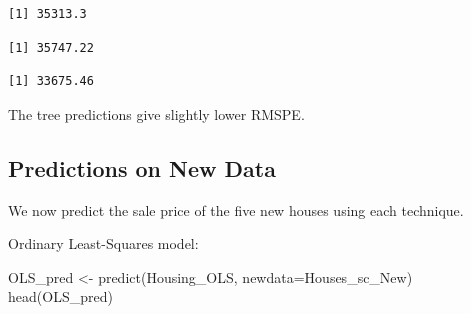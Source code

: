 \documentclass[
  letterpaper,
  DIV=11,
  numbers=noendperiod]{scrreprt}
\newenvironment{Shaded}{\begin{snugshade}}{\end{snugshade}}
\newcommand{\AttributeTok}[1]{\textcolor[rgb]{0.40,0.45,0.13}{#1}}
\newcommand{\FunctionTok}[1]{\textcolor[rgb]{0.28,0.35,0.67}{#1}}
\newcommand{\NormalTok}[1]{\textcolor[rgb]{0.00,0.23,0.31}{#1}}
\newcommand{\OtherTok}[1]{\textcolor[rgb]{0.00,0.23,0.31}{#1}}
\newcommand{\SpecialCharTok}[1]{\textcolor[rgb]{0.37,0.37,0.37}{#1}}
\begin{document}
\begin{Shaded}
\end{Shaded}

\begin{verbatim}
[1] 35313.3
\end{verbatim}

\begin{Shaded}
\end{Shaded}

\begin{verbatim}
[1] 35747.22
\end{verbatim}

\begin{Shaded}
\end{Shaded}

\begin{verbatim}
[1] 33675.46
\end{verbatim}

The tree predictions give slightly lower RMSPE.

\subsection{Predictions on New Data}\label{predictions-on-new-data}

We now predict the sale price of the five new houses using each
technique.

Ordinary Least-Squares model:

\begin{Shaded}
\begin{Highlighting}[]
\NormalTok{OLS\_pred }\OtherTok{\textless{}{-}} \FunctionTok{predict}\NormalTok{(Housing\_OLS, }\AttributeTok{newdata=}\NormalTok{Houses\_sc\_New)}
\FunctionTok{head}\NormalTok{(OLS\_pred)}
\end{Highlighting}
\end{Shaded}
\end{document}
